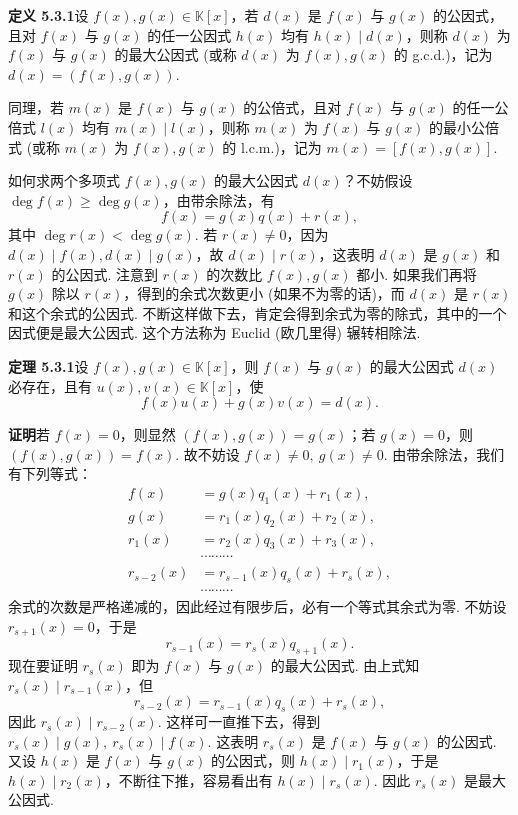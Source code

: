 \documentclass[UTF8, 12pt, fontset=fandol, oneside]{ctexart}
\begin{document}
\noindent\textbf{定义 5.3.1}\quad 设 $f(x),g(x)\in\mathbb{K}[x]$，若 $d(x)$ 是 $f(x)$ 与 $g(x)$ 的公因式，且对 $f(x)$ 与 $g(x)$ 的任一公因式 $h(x)$ 均有 $h(x)\mid d(x)$，则称 $d(x)$ 为 $f(x)$ 与 $g(x)$ 的最大公因式 (或称 $d(x)$ 为 $f(x),g(x)$ 的 g.c.d.)，记为 $d(x)=(f(x),g(x))$.

同理，若 $m(x)$ 是 $f(x)$ 与 $g(x)$ 的公倍式，且对 $f(x)$ 与 $g(x)$ 的任一公倍式 $l(x)$ 均有 $m(x)\mid l(x)$，则称 $m(x)$ 为 $f(x)$ 与 $g(x)$ 的最小公倍式 (或称 $m(x)$ 为 $f(x),g(x)$ 的 l.c.m.)，记为 $m(x)=[f(x),g(x)]$.

如何求两个多项式 $f(x),g(x)$ 的最大公因式 $d(x)$？不妨假设 $\deg f(x)\geq \deg g(x)$，由带余除法，有
\[
f(x)=g(x)q(x)+r(x),
\]
其中 $\deg r(x)<\deg g(x)$. 若 $r(x)\neq 0$，因为 $d(x)\mid f(x),d(x)\mid g(x)$，故 $d(x)\mid r(x)$，这表明 $d(x)$ 是 $g(x)$ 和 $r(x)$ 的公因式. 注意到 $r(x)$ 的次数比 $f(x),g(x)$ 都小. 如果我们再将 $g(x)$ 除以 $r(x)$，得到的余式次数更小 (如果不为零的话)，而 $d(x)$ 是 $r(x)$ 和这个余式的公因式. 不断这样做下去，肯定会得到余式为零的除式，其中的一个因式便是最大公因式. 这个方法称为 Euclid (欧几里得) 辗转相除法.

\noindent\textbf{定理 5.3.1}\quad 设 $f(x),g(x)\in\mathbb{K}[x]$，则 $f(x)$ 与 $g(x)$ 的最大公因式 $d(x)$ 必存在，且有 $u(x),v(x)\in\mathbb{K}[x]$，使
\begin{equation}
f(x)u(x)+g(x)v(x)=d(x).
\tag{5.3.1}
\end{equation}

\noindent\textbf{证明}\quad 若 $f(x)=0$，则显然 $(f(x),g(x))=g(x)$；若 $g(x)=0$，则 $(f(x),g(x))=f(x)$. 故不妨设 $f(x)\neq 0,\ g(x)\neq 0$. 由带余除法，我们有下列等式：
\[
\begin{aligned}
f(x)&=g(x)q_1(x)+r_1(x),\\
g(x)&=r_1(x)q_2(x)+r_2(x),\\
r_1(x)&=r_2(x)q_3(x)+r_3(x),\\
&\cdots\cdots\cdots\\
r_{s-2}(x)&=r_{s-1}(x)q_s(x)+r_s(x),\\
&\cdots\cdots\cdots
\end{aligned}
\]
余式的次数是严格递减的，因此经过有限步后，必有一个等式其余式为零. 不妨设 $r_{s+1}(x)=0$，于是
\[
r_{s-1}(x)=r_s(x)q_{s+1}(x).
\]
现在要证明 $r_s(x)$ 即为 $f(x)$ 与 $g(x)$ 的最大公因式. 由上式知 $r_s(x)\mid r_{s-1}(x)$，但
\begin{equation}
r_{s-2}(x)=r_{s-1}(x)q_s(x)+r_s(x),
\tag{5.3.2}
\end{equation}
因此 $r_s(x)\mid r_{s-2}(x)$. 这样可一直推下去，得到 $r_s(x)\mid g(x),\ r_s(x)\mid f(x)$. 这表明 $r_s(x)$ 是 $f(x)$ 与 $g(x)$ 的公因式. 又设 $h(x)$ 是 $f(x)$ 与 $g(x)$ 的公因式，则 $h(x)\mid r_1(x)$，于是 $h(x)\mid r_2(x)$，不断往下推，容易看出有 $h(x)\mid r_s(x)$. 因此 $r_s(x)$ 是最大公因式.
\end{document}
